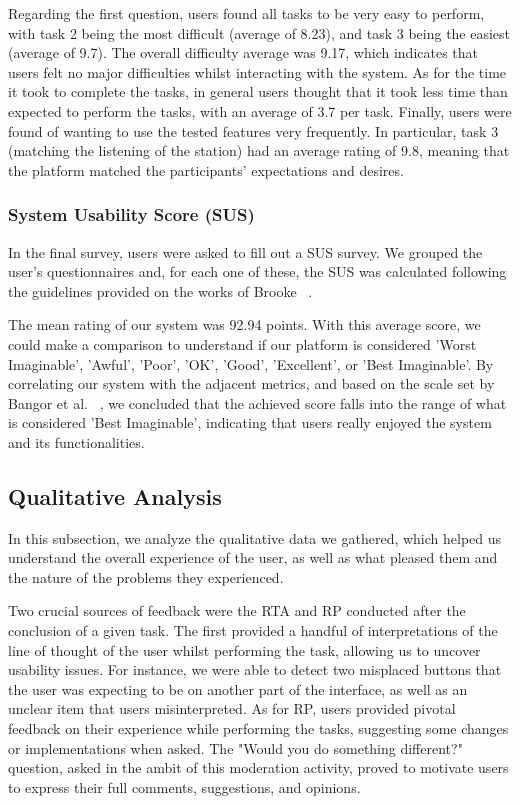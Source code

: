 {Regarding the first question, users found all tasks to be very easy to perform, with task 2 being the most difficult (average of 8.23), and task 3 being the easiest (average of 9.7). The overall difficulty average was 9.17, which indicates that users felt no major difficulties whilst interacting with the system. As for the time it took to complete the tasks, in general users thought that it took less time than expected to perform the tasks, with an average of 3.7 per task. Finally, users were found of wanting to use the tested features very frequently. In particular, task 3 (matching the listening of the station) had an average rating of 9.8, meaning that the platform matched the participants' expectations and desires.

\subsubsection{System Usability Score (SUS)}

In the final survey, users were asked to fill out a \ac{SUS} survey. We grouped the user’s questionnaires and, for each one of these, the \ac{SUS} was calculated following the guidelines provided on the works of Brooke ~\cite{Kusic2018}.

The mean rating of our system was 92.94 points. With this average score, we could make a comparison to understand if our platform is considered 'Worst Imaginable', 'Awful', 'Poor', 'OK', 'Good', 'Excellent', or 'Best Imaginable'. By correlating our system with the adjacent metrics, and based on the scale set by Bangor et al. ~\cite{Donovan2018}, we concluded that the achieved score falls into the range of what is considered 'Best Imaginable', indicating that users really enjoyed the system and its functionalities.


\subsection{Qualitative Analysis}

In this subsection, we analyze the qualitative data we gathered, which helped us understand the overall experience of the user, as well as what pleased them and the nature of the problems they experienced.

Two crucial sources of feedback were the \ac{RTA} and \ac{RP} conducted after the conclusion of a given task. The first provided a handful of interpretations of the line of thought of the user whilst performing the task, allowing us to uncover usability issues. For instance, we were able to detect two misplaced buttons that the user was expecting to be on another part of the interface, as well as an unclear item that users misinterpreted. As for \ac{RP}, users provided pivotal feedback on their experience while performing the tasks, suggesting some changes or implementations when asked. The "Would you do something different?" question, asked in the ambit of this moderation activity, proved to motivate users to express their full comments, suggestions, and opinions.

}
